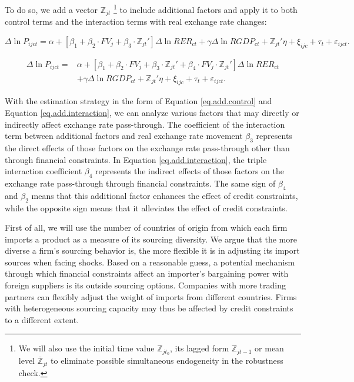 \documentclass[12pt]{article}
\begin{document}
To do so, we add a vector $\mathbb{Z}_{jt}$ \footnote{We will also use the initial time value $\mathbb{Z}_{jt_0}$, its lagged form $\mathbb{Z}_{jt-1}$ or mean level $\bar{\mathbb{Z}}_{jt}$ to eliminate possible simultaneous endogeneity in the robustness check.} to include additional factors and apply it to both control terms and the interaction terms with real exchange rate changes: 

\begin{equation}
	\Delta \ln P_{ijct}=\alpha+[\beta_{1}+ \beta_{2} \cdot FV_{j}+\beta_{3} \cdot {\mathbb{Z}_{jt}}'] \Delta \ln RER_{ct} +\gamma \Delta \ln RGDP_{ct}+ {\mathbb{Z}_{jt}}' \eta+\xi_{ijc}+\tau_{t} +\varepsilon_{ijct}.
	\label{eq.add.control}
\end{equation}

\begin{equation}
	\begin{aligned}
	\Delta \ln P_{ijct}=&\alpha+[\beta_{1}+ \beta_{2} \cdot FV_{j}+\beta_{3} \cdot {\mathbb{Z}_{jt}}'+\beta_{4} \cdot FV_{j} \cdot {\mathbb{Z}_{jt}}'] \Delta \ln RER_{ct} \\ &+\gamma \Delta \ln RGDP_{ct}+ {\mathbb{Z}_{jt}}' \eta+\xi_{ijc}+\tau_{t} +\varepsilon_{ijct}.
	\end{aligned}	
	\label{eq.add.interaction}
\end{equation}

With the estimation strategy in the form of Equation \ref{eq.add.control} and Equation \ref{eq.add.interaction}, we can analyze various factors that may directly or indirectly affect exchange rate pass-through. The coefficient of the interaction term between additional factors and real exchange rate movement $\beta_3$ represents the direct effects of those factors on the exchange rate pass-through other than through financial constraints. In Equation \ref{eq.add.interaction}, the triple interaction coefficient $\beta_4$ represents the indirect effects of those factors on the exchange rate pass-through through financial constraints. The same sign of $\beta_4$ and $\beta_2$ means that this additional factor enhances the effect of credit constraints, while the opposite sign means that it alleviates the effect of credit constraints. 

First of all, we will use the number of countries of origin from which each firm imports a product as a measure of its sourcing diversity. We argue that the more diverse a firm's sourcing behavior is, the more flexible it is in adjusting its import sources when facing shocks. Based on a reasonable guess, a potential mechanism through which financial constraints affect an importer's bargaining power with foreign suppliers is its outside sourcing options. Companies with more trading partners can flexibly adjust the weight of imports from different countries. Firms with heterogeneous sourcing capacity may thus be affected by credit constraints to a different extent. 
\end{document}

